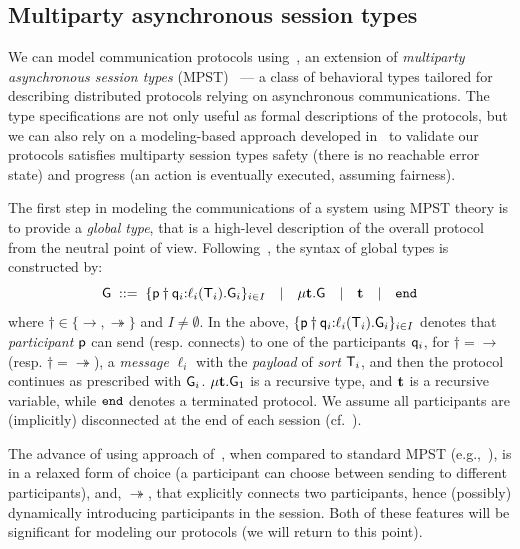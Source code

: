 \subsection{Multiparty asynchronous session types}\label{sec:multiparty}
%
We can model communication protocols %
using~\cite{HuY17}, an extension of \emph{multiparty asynchronous session types} (MPST)~\cite{HondaYC08} %
--- a class of behavioral types tailored for describing distributed protocols relying on asynchronous
communications. 
The type specifications are not only useful as formal descriptions of the protocols, but we can also rely on a modeling-based approach developed in~\cite{HuY17} to validate our protocols satisfies multiparty session types safety (there is no reachable error state) and progress (an action is eventually executed, assuming
fairness). %

The first step in modeling the communications of a system using MPST theory 
is to provide a \emph{global type}, that is a high-level description of the overall protocol from the neutral 
point of view. 
Following~\cite{HuY17}, the syntax of global types is constructed by:\\ 
\[
{\sf G} \; ::= \;
\{{\sf p}\dagger{\sf q}_i{:}\ell_i({\mathsf T}_i).{\sf G}_i\}_{i\in I}  \quad | \quad 
\mu \textbf{t}.{\sf G} \quad | \quad 
\textbf{t} \quad | \quad
\mathtt{end}
\] 
where $\dagger\in\{\to, \twoheadrightarrow\}$ and $I\not=\emptyset$. 
In the above, $\{{\sf p}\dagger{\sf q}_i{:}\ell_i({\mathsf T}_i).{\sf G}_i\}_{i\in I}$
denotes that \emph{participant} ${\sf p}$ can send (resp. connects) to one of the participants ${\sf q}_i$, 
for $\dagger=\to$ (resp. $\dagger=\twoheadrightarrow$), 
a \emph{message} $\ell_i$ with the \emph{payload} of \emph{sort} ${\mathsf T}_i$, 
and then the protocol continues as prescribed with ${\sf G}_i$.  
$\mu \textbf{t}.{\sf G}_1$ is a recursive type, and $\textbf{t}$ is a recursive variable, 
while $\mathtt{end}$ denotes a terminated protocol. We assume all participants are (implicitly) disconnected at the end of each session (cf.~\cite{HuY17}). 

The advance of using approach of~\cite{HuY17}, when compared to standard MPST (e.g.,~\cite{HondaYC08}),
is in a relaxed form of choice (a participant can choose between sending to different participants), 
and, $\twoheadrightarrow$, that explicitly connects two participants, hence (possibly) dynamically 
introducing participants in the session.
Both of these features will be significant for modeling our protocols (we will return to this point).

